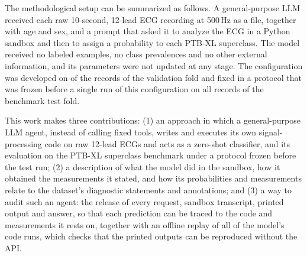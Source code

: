 The methodological setup can be summarized as follows. A general-purpose LLM received each raw 10-second, 12-lead ECG
recording at 500\,Hz as a file, together with age and sex,
and a prompt that asked it to analyze the ECG in a Python sandbox and then to assign a probability to each PTB-XL
superclass. The model received no labeled examples, no class prevalences and no other external information, and its
parameters were not updated at any stage. The configuration was developed on \NDevRecordsUsed{} of the \NValFold{}
records of the validation fold and fixed in a protocol that was frozen before a single run of this configuration on all
\NTest{} records of the benchmark test fold.

This work makes three contributions: (1) an approach in which a general-purpose LLM agent, instead of calling fixed
tools, writes and executes its own signal-processing code on raw 12-lead ECGs and acts as a zero-shot classifier, and its
evaluation on the PTB-XL superclass benchmark under a protocol frozen before the test run; (2) a description of what the model did in the sandbox, how it obtained
the measurements it stated, and how its probabilities and measurements relate to the dataset's diagnostic statements
and annotations; and (3) a way to audit such an agent: the release of every request, sandbox transcript, printed output and answer, so
that each prediction can be traced to the code and measurements it rests on, together with an offline replay of all of
the model's code runs, which checks that the printed outputs can be reproduced without the API.
